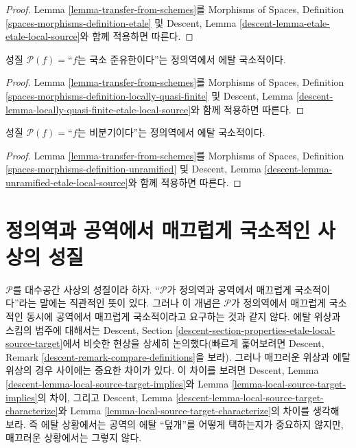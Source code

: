\begin{proof}
Lemma \ref{lemma-transfer-from-schemes}를 Morphisms of Spaces, Definition
\ref{spaces-morphisms-definition-etale} 및 Descent, Lemma
\ref{descent-lemma-etale-etale-local-source}와 함께 적용하면 따른다.
\end{proof}

\begin{lemma}
\label{lemma-locally-quasi-finite-etale-local-source}
성질 $\mathcal{P}(f)=$``$f$는 국소 준유한이다''는 정의역에서 에탈
국소적이다.
\end{lemma}

\begin{proof}
Lemma \ref{lemma-transfer-from-schemes}를 Morphisms of Spaces, Definition
\ref{spaces-morphisms-definition-locally-quasi-finite} 및 Descent, Lemma
\ref{descent-lemma-locally-quasi-finite-etale-local-source}와 함께 적용하면
따른다.
\end{proof}

\begin{lemma}
\label{lemma-unramified-etale-local-source}
성질 $\mathcal{P}(f)=$``$f$는 비분기이다''는 정의역에서 에탈 국소적이다.
\end{lemma}

\begin{proof}
Lemma \ref{lemma-transfer-from-schemes}를 Morphisms of Spaces, Definition
\ref{spaces-morphisms-definition-unramified} 및 Descent, Lemma
\ref{descent-lemma-unramified-etale-local-source}와 함께 적용하면 따른다.
\end{proof}

\section{정의역과 공역에서 매끄럽게 국소적인 사상의 성질}
\label{section-properties-local-source-target}

\noindent
$\mathcal{P}$를 대수공간 사상의 성질이라 하자. ``$\mathcal{P}$가
정의역과 공역에서 매끄럽게 국소적이다''라는 말에는 직관적인 뜻이 있다.
그러나 이 개념은 $\mathcal{P}$가 정의역에서 매끄럽게 국소적인 동시에
공역에서 매끄럽게 국소적이라고 요구하는 것과 같지 않다. 에탈 위상과
스킴의 범주에 대해서는 Descent, Section
\ref{descent-section-properties-etale-local-source-target}에서 비슷한 현상을
상세히 논의했다(빠르게 훑어보려면 Descent, Remark
\ref{descent-remark-compare-definitions}을 보라). 그러나 매끄러운 위상과
에탈 위상의 경우 사이에는 중요한 차이가 있다. 이 차이를 보려면 Descent,
Lemma \ref{descent-lemma-local-source-target-implies}와 Lemma
\ref{lemma-local-source-target-implies}의 차이, 그리고 Descent, Lemma
\ref{descent-lemma-local-source-target-characterize}와 Lemma
\ref{lemma-local-source-target-characterize}의 차이를 생각해 보라. 즉 에탈
상황에서는 공역의 에탈 ``덮개''를 어떻게 택하는지가 중요하지 않지만,
매끄러운 상황에서는 그렇지 않다.

